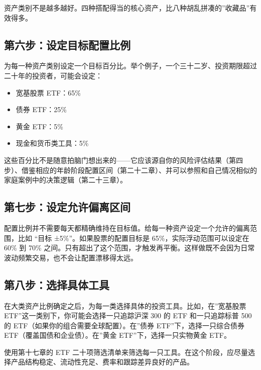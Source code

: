 \documentclass[a4paper,11pt,oneside,fontset=none,UTF8,zihao=-4]{ctexbook}
\providecommand{\tightlist}{\setlength{\itemsep}{2pt}\setlength{\parskip}{1pt}}
\begin{document}
资产类别不是越多越好。四种搭配得当的核心资产，比八种胡乱拼凑的''收藏品''有效得多。

\subsection{第六步：设定目标配置比例}\label{ux7b2cux516dux6b65ux8bbeux5b9aux76eeux6807ux914dux7f6eux6bd4ux4f8b}

为每一种资产类别设定一个目标百分比。举个例子，一个三十二岁、投资期限超过二十年的投资者，可能会设定：

\begin{itemize}
\tightlist
\item
  宽基股票 ETF：65\%
\item
  债券 ETF：25\%
\item
  黄金 ETF：5\%
\item
  现金和货币类工具：5\%
\end{itemize}

这些百分比不是随意拍脑门想出来的------它应该源自你的风险评估结果（第四步）、借鉴相应的年龄阶段配置区间（第二十二章）、并可以参照和自己情况相似的家庭案例中的决策逻辑（第二十三章）。

\subsection{第七步：设定允许偏离区间}\label{ux7b2cux4e03ux6b65ux8bbeux5b9aux5141ux8bb8ux504fux79bbux533aux95f4}

配置比例并不需要每天都精确维持在目标值。给每一种资产设定一个允许的偏离范围，比如
``目标 ±5\%''。如果股票的配置目标是 65\%，实际浮动范围可以设定在 60\% 到
70\%
之间。只有超出了这个范围，才触发再平衡。这样做既不会因为日常波动频繁交易，也不会让配置漂移得太远。

\subsection{第八步：选择具体工具}\label{ux7b2cux516bux6b65ux9009ux62e9ux5177ux4f53ux5de5ux5177}

在大类资产比例确定之后，为每一类选择具体的投资工具。比如，在''宽基股票
ETF''这一类别下，你可能会选择一只追踪沪深 300 的 ETF 和一只追踪标普 500
的 ETF（如果你的组合需要全球配置）。在''债券 ETF''下，选择一只综合债券
ETF（覆盖国债和企业债）。在''黄金 ETF''下，选择一只实物黄金 ETF。

使用第十七章的 ETF
二十项筛选清单来筛选每一只工具。在这个阶段，应尽量选择产品结构稳定、流动性充足、费率和跟踪差异良好的产品。
\end{document}
